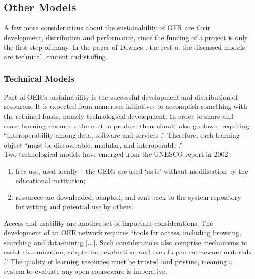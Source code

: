 \documentclass[a4paper]{article}
\begin{document}
\subsection{Other Models} 
A few more considerations about the sustainability of OER are their development, distribution and performance, since the funding of a project is only the first step of many. In the paper of Downes \cite{sustain}, the rest of the discussed models are technical, content and staffing. 

\subsubsection{Technical Models} 

Part of OER's sustainability is the successful development and distribution of resources. It is expected from numerous initiatives to accomplish something with the retained funds, namely technological development. In order to share and reuse learning resources, the cost to produce them should also go down, requiring ``interoperability among data, software and services \cite[p.36]{sustain}.'' Therefore, each learning object ``must be discoverable, modular, and interoperable \cite[p.36]{sustain}.'' \\

\noindent
Two technological models have emerged from the UNESCO report in 2002 \cite{open-courseware}:  
\begin{enumerate}
\item free use, used locally – the OERs are used ‘as is’ without modification by the educational institution;
\item resources are downloaded, adapted, and sent back to the system repository for vetting and potential use by others.
\end{enumerate}

\noindent
Access and usability are another set of important considerations. The development of an OER network requires ``tools for access, including browsing, searching and data-mining [...]. Such considerations also comprise mechanisms to assist dissemination, adaptation, evaluation, and use of open courseware materials \cite[p.37]{sustain}.'' The quality of learning resources must be trusted and pristine, meaning a system to evaluate any open courseware is imperative. \\
\end{document}
